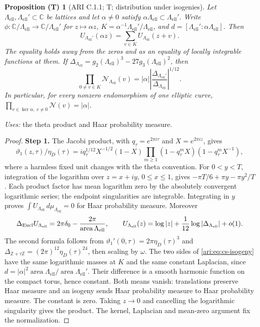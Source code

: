 \documentclass[11pt,a4paper]{article}
\theoremstyle{plain}
\newtheorem{proposition}[theorem]{Proposition (T)}
\theoremstyle{definition}
\begin{document}
\begin{proposition}[ARI C.1.1; T; distribution under isogenies]\label{ari:C.1.1}
Let $\Lambda_{\mathrm{ell}},\Lambda_{\mathrm{ell}}'\subset\mathbb C$ be lattices and let
$\alpha\ne0$ satisfy $\alpha\Lambda_{\mathrm{ell}}\subset\Lambda_{\mathrm{ell}}'$. Write
$\phi:\mathbb C/\Lambda_{\mathrm{ell}}\to\mathbb C/\Lambda_{\mathrm{ell}}'$ for $z\mapsto\alpha z$,
$K=\alpha^{-1}\Lambda_{\mathrm{ell}}'/\Lambda_{\mathrm{ell}}$, and
$d=[\Lambda_{\mathrm{ell}}':\alpha\Lambda_{\mathrm{ell}}]$. Then
\begin{equation}\label{ari:eq:cs-isogeny}
 U_{\Lambda_{\mathrm{ell}}'}(\alpha z)=\sum_{v\in K}U_{\Lambda_{\mathrm{ell}}}(z+v).
\end{equation}
The equality holds away from the zeros and as an equality of locally
integrable functions at them. If $\Delta_{\Lambda_{\mathrm{ell}}}=g_2(\Lambda_{\mathrm{ell}})^3-
27g_3(\Lambda_{\mathrm{ell}})^2$, then
\[
 \prod_{0\ne v\in K}\mathcal N_{\Lambda_{\mathrm{ell}}}(v)
 =|\alpha|\left|\frac{\Delta_{\Lambda_{\mathrm{ell}}'}}{\Delta_{\Lambda_{\mathrm{ell}}}}\right|^{1/12}.
\]
In particular, for every nonzero endomorphism of one elliptic curve,
$\prod_{v\in\ker\alpha,\ v\ne0}\mathcal N(v)=|\alpha|$.
\end{proposition}
\noindent\textit{Uses:} the theta product and Haar probability measure.\par
\begin{proof}
\noindent\textbf{Step 1.} The Jacobi product, with $q_\tau=e^{2\pi i\tau}$ and
$X=e^{2\pi iz}$, gives
\[
 \vartheta _1(z,\tau)/\eta_D(\tau)
 =i q_\tau^{1/12}X^{-1/2}(1-X)
     \prod_{m\ge1}(1-q_\tau^mX)(1-q_\tau^mX^{-1}),
\]
where a harmless fixed unit changes with the theta convention. For
$0<y<T$, integration of the logarithm over $z=x+iy$, $0\le x\le1$,
gives $-\pi T/6+\pi y-\pi y^2/T$. Each product factor has mean logarithm
zero by the absolutely convergent logarithmic series; the endpoint
singularities are integrable. Integrating in $y$ proves
$\int U_{\Lambda_{\mathrm{ell}}}\,d\mu_{\Lambda_{\mathrm{ell}}}=0$ for Haar probability measure.
Moreover
\[
 \Delta_{\rm Eucl}U_{\Lambda_{\mathrm{ell}}}
   =2\pi\delta_0-\frac{2\pi}{\operatorname{area}\Lambda_{\mathrm{ell}}},\qquad
 U_{\Lambda_{\mathrm{ell}}}(z)=\log|z|+\frac1{12}\log|\Delta_{\Lambda_{\mathrm{ell}}}|+o(1).
\]
The second formula follows from
$\vartheta _1'(0,\tau)=2\pi\eta_D(\tau)^3$ and
$\Delta_{\mathbb Z+\tau\mathbb Z}=(2\pi)^{12}\eta_D(\tau)^{24}$,
then scaling by $\omega$. The two sides of
\eqref{ari:eq:cs-isogeny} have the same logarithmic masses at $K$ and the
same constant Laplacian, since
$d=|\alpha|^2\operatorname{area}\Lambda_{\mathrm{ell}}/
\operatorname{area}\Lambda_{\mathrm{ell}}'$. Their difference is a smooth harmonic
function on the compact torus, hence constant. Both means vanish:
translations preserve Haar measure and an isogeny sends Haar
probability measure to Haar probability measure. The constant is zero.
Taking $z\to0$ and cancelling the logarithmic singularity gives the
product. The kernel, Laplacian and mean-zero argument fix the normalization.
\end{proof}
\end{document}
